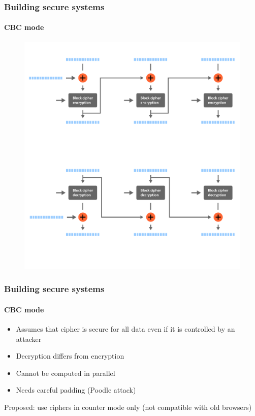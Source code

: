 \documentclass[11pt,t]{beamer}
\begin{document}
\begin{frame}[fragile]
\frametitle{Building secure systems}
\framesubtitle{CBC mode}
\begin{figure}[H]
\includegraphics[height=0.85\textheight]{cbc.pdf}
\end{figure}
\end{frame}

\begin{frame}
\frametitle{Building secure systems}
\framesubtitle{CBC mode}
\begin{itemize}
\item Assumes that cipher is secure for all data even if it is controlled by an attacker
\item Decryption differs from encryption
\item Cannot be computed in parallel
\item Needs careful padding (Poodle attack)
\end{itemize}
Proposed: use ciphers in counter mode only (not compatible with old browsers)
\end{frame}
\end{document}
